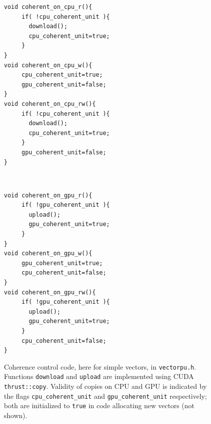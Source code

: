 


\begin{figure}[tb]
\begin{minipage}{.48\textwidth}
\begin{small}
\begin{verbatim}
void coherent_on_cpu_r(){
  	 if( !cpu_coherent_unit ){
       download();
       cpu_coherent_unit=true;
  	 }
}
void coherent_on_cpu_w(){
  	 cpu_coherent_unit=true;
  	 gpu_coherent_unit=false;
}
void coherent_on_cpu_rw(){
  	 if( !cpu_coherent_unit ){
       download();
       cpu_coherent_unit=true;
  	 }
  	 gpu_coherent_unit=false;
}
\end{verbatim}
\end{small}
\end{minipage}\qquad~
\begin{minipage}{.48\textwidth}
\begin{small}
\begin{verbatim}
void coherent_on_gpu_r(){
  	 if( !gpu_coherent_unit ){
       upload();
       gpu_coherent_unit=true;
	 }
}
void coherent_on_gpu_w(){
  	 gpu_coherent_unit=true;
  	 cpu_coherent_unit=false;
}
void coherent_on_gpu_rw(){
  	 if( !gpu_coherent_unit ){
       upload();
       gpu_coherent_unit=true;
  	 }
  	 cpu_coherent_unit=false;
}
\end{verbatim}
\end{small}
\end{minipage}
\caption{\label{fig:vectorpucoherence}Coherence control code,
    here for simple vectors,
    in \texttt{vectorpu.h}. Functions \texttt{download} and
    \texttt{upload} are implemented using CUDA
    \texttt{thrust::copy}. Validity of copies on CPU and GPU
     is indicated
     by the flags \texttt{cpu\_coherent\_unit} and
     \texttt{gpu\_coherent\_unit} respectively; both are
     initialized to \texttt{true}
     in code allocating new vectors (not shown).}
\end{figure}




